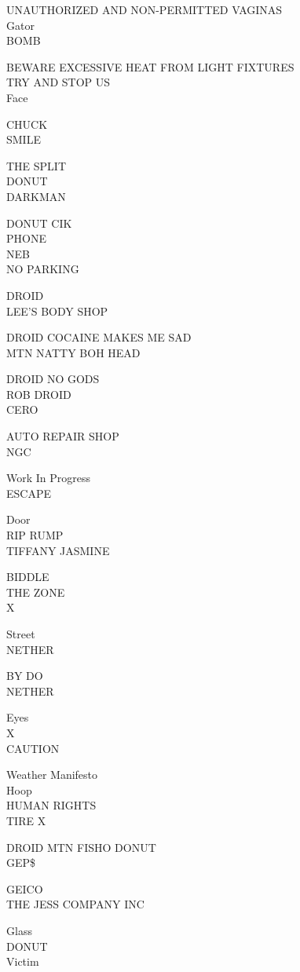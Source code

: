 \documentclass[10pt,letterpaper]{article}
\begin{document}
UNAUTHORIZED AND NON{-}PERMITTED VAGINAS\\
Gator\\
BOMB

BEWARE EXCESSIVE HEAT FROM LIGHT FIXTURES\\
TRY AND STOP US\\
Face

CHUCK\\
SMILE

THE SPLIT\\
DONUT\\
DARKMAN

DONUT CIK\\
PHONE\\
NEB\\
NO PARKING

DROID\\
LEE'S BODY SHOP

DROID COCAINE MAKES ME SAD\\
MTN NATTY BOH HEAD

DROID NO GODS\\
ROB DROID\\
CERO

AUTO REPAIR SHOP\\
NGC

Work In Progress\\
ESCAPE

Door\\
RIP RUMP\\
TIFFANY JASMINE

BIDDLE\\
THE ZONE\\
X

Street\\
NETHER

BY DO\\
NETHER

Eyes\\
X\\
CAUTION

Weather Manifesto\\
Hoop\\
HUMAN RIGHTS\\
TIRE X

DROID MTN FISHO DONUT\\
GEP\$

GEICO\\
THE JESS COMPANY INC

Glass\\
DONUT\\
Victim
\end{document}

